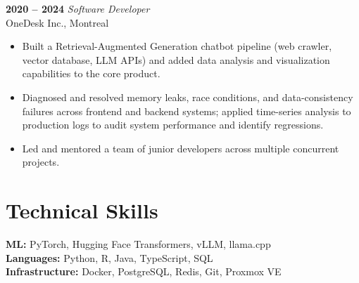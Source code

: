 \documentclass[11pt,letterpaper]{article}
\begin{document}
\vspace{0.2cm}

\noindent
\textbf{2020 -- 2024} \hfill \textit{Software Developer} \\
OneDesk Inc., Montreal

\begin{itemize}[leftmargin=0.5cm]
	\item Built a Retrieval-Augmented Generation chatbot pipeline (web crawler, vector database, LLM APIs) and added data analysis and visualization capabilities to the core product.
	\item Diagnosed and resolved memory leaks, race conditions, and data-consistency failures across frontend and backend systems; applied time-series analysis to production logs to audit system performance and identify regressions.
	\item Led and mentored a team of junior developers across multiple concurrent projects.
\end{itemize}

\vspace{0.2cm}

\section*{Technical Skills}

\noindent
\textbf{ML:} PyTorch, Hugging Face Transformers, vLLM, llama.cpp \\
\textbf{Languages:} Python, R, Java, TypeScript, SQL \\
\textbf{Infrastructure:} Docker, PostgreSQL, Redis, Git, Proxmox VE
\end{document}
